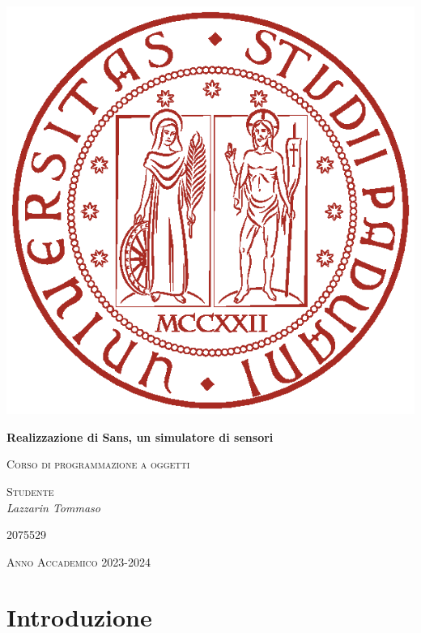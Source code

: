 \documentclass[a4paper]{article}
\begin{document}
\begin{titlepage}
    \centering
    \includegraphics{img/universita-degli-studi-di-padova.eps}
    {\huge\bfseries Realizzazione di Sans, un simulatore di sensori\par}
    \vspace{0.5cm}
	{\scshape\Large Corso di programmazione a oggetti\par}
	\vspace{1.5cm}
    {\raggedright \textsc{Studente} \\ \Large\itshape Lazzarin Tommaso\par}
    \vspace{0.1cm}
    {\raggedright\textsc{2075529}\par}
    \vfill
	{\large \textsc{Anno Accademico 2023-2024}}
\end{titlepage}
\clearpage
\tableofcontents
\clearpage
\section{Introduzione}
\end{document}
